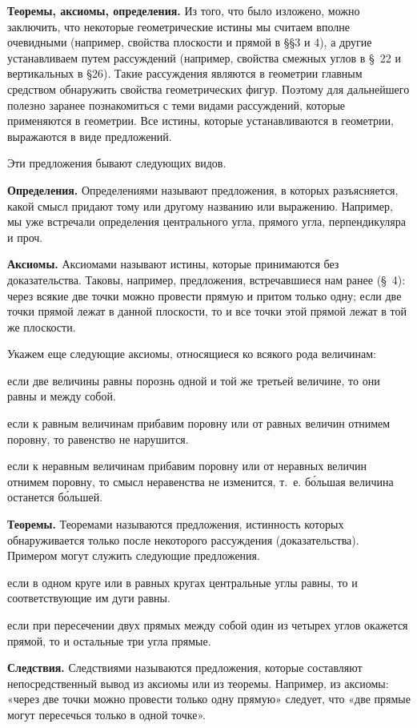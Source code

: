 \documentclass[oneside]{book}
\begin{document}
\textbf{Теоремы, аксиомы, определения.}
Из того, что было изложено, можно заключить, что некоторые геометрические истины мы считаем вполне очевидными (например, свойства плоскости и прямой в §§3 и 4), а другие устанавливаем путем рассуждений (например, свойства смежных углов в §~22 и вертикальных в §26).
Такие рассуждения являются в геометрии главным средством обнаружить свойства геометрических фигур.
Поэтому для дальнейшего полезно заранее познакомиться с теми видами рассуждений, которые применяются в геометрии.
Все истины, которые устанавливаются в геометрии, выражаются в виде предложений.

Эти предложения бывают следующих видов.

\textbf{Определения.}
Определениями называют предложения, в которых разъясняется, какой смысл придают тому или другому названию или выражению.
Например, мы уже встречали определения центрального угла, прямого угла, перпендикуляра и проч. %

\textbf{Аксиомы.}
Аксиомами называют истины, которые принимаются без доказательства.
Таковы, например, предложения, встречавшиеся нам ранее (§~4):
через всякие две точки можно провести прямую и притом только одну;
если две точки прямой лежат в данной плоскости, то и все точки этой прямой лежат в той же плоскости.

Укажем еще следующие аксиомы, относящиеся ко всякого рода величинам:

если две величины равны порознь одной и той же третьей величине, то они равны и между собой.

если к равным величинам прибавим поровну или от равных величин отнимем поровну, то равенство не нарушится.

если к неравным величинам прибавим поровну или от неравных величин отнимем поровну, то смысл неравенства не изменится, т.~е. б\'{о}льшая величина останется б\'{о}льшей.

\textbf{Теоремы.}
Теоремами называются предложения, истинность которых обнаруживается только после некоторого рассуждения (доказательства).
Примером могут служить следующие предложения.

если в одном круге или в равных кругах центральные углы равны, то и соответствующие им дуги равны.

если при пересечении двух прямых между собой один из четырех углов окажется прямой, то и остальные три угла прямые.

\textbf{Следствия.}
Следствиями называются предложения, которые составляют непосредственный вывод из аксиомы или из теоремы.
Например, из аксиомы:
«через две точки можно провести только одну прямую» следует, что «две прямые могут пересечься только в одной точке».
\end{document}
